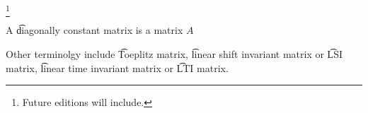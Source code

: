 
\footnote{Future editions will include.}


A \t{diagonally constant matrix} is a matrix $A$

Other terminolgy include \t{Toeplitz matrix}, \t{linear shift invariant matrix} or \t{LSI matrix}, \t{linear time invariant matrix} or \t{LTI matrix}.

\blankpage
